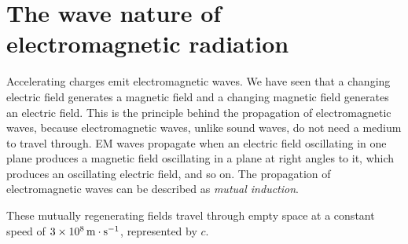\section{The wave nature of electromagnetic radiation}

Accelerating charges emit electromagnetic waves. We have seen that a changing electric field generates a magnetic field and a changing magnetic field generates an electric field. This is the principle behind the propagation of electromagnetic waves, because electromagnetic waves, unlike sound waves, do not need a medium to travel through. EM waves propagate when an electric field oscillating in one plane produces a magnetic field oscillating in a plane at right angles to it, which produces an oscillating electric field, and so on. The propagation of electromagnetic waves can be described as \textit{mutual induction}. 

These mutually regenerating fields travel through empty space at a constant speed of $3 \times 10^8\,\mathrm{m \cdot s^{-1}}$, represented by $c$.

\begin{center}
\end{center}

